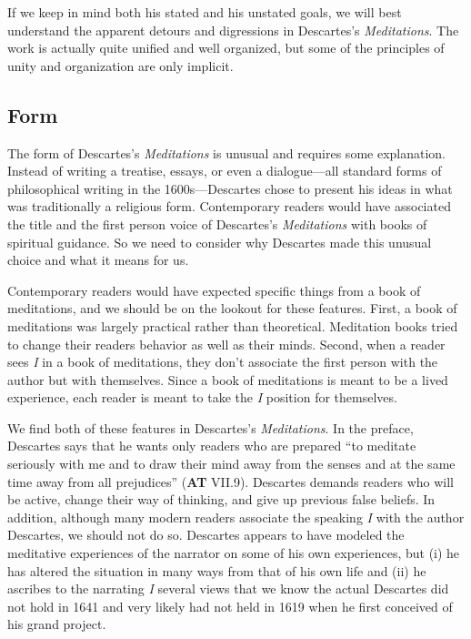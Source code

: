 If we keep in mind both his stated and his unstated goals, we will best understand the apparent detours and digressions in Descartes's \textit{Meditations}. The work is actually quite unified and well organized, but some of the principles of unity and organization are only implicit.

\subsection*{Form}

The form of Descartes's \textit{Meditations} is unusual and requires some explanation. Instead of writing a treatise, essays, or even a dialogue---all standard forms of philosophical writing in the 1600s---Descartes chose to present his ideas in what was traditionally a religious form. Contemporary readers would have associated the title and the first person voice of Descartes's \textit{Meditations} with books of spiritual guidance. So we need to consider why Descartes made this unusual choice and what it means for us.

Contemporary readers would have expected specific things from a book of meditations, and we should be on the lookout for these features. First, a book of meditations was largely practical rather than theoretical. Meditation books tried to change their readers behavior as well as their minds. Second, when a reader sees \textit{I} in a book of meditations, they don't associate the first person with the author but with themselves. Since a book of meditations is meant to be a lived experience, each reader is meant to take the \textit{I} position for themselves.

We find both of these features in Descartes's \textit{Meditations}. In the preface, Descartes says that he wants only readers who are prepared ``to meditate seriously with me and to draw their mind away from the senses and at the same time away from all prejudices'' (\textbf{AT} VII.9). Descartes demands readers who will be active, change their way of thinking, and give up previous false beliefs. In addition, although many modern readers associate the speaking \textit{I} with the author Descartes, we should not do so. Descartes appears to have modeled the meditative experiences of the narrator on some of his own experiences, but (i) he has altered the situation in many ways from that of his own life and (ii) he ascribes to the narrating \textit{I} several views that we know the actual Descartes did not hold in 1641 and very likely had not held in 1619 when he first conceived of his grand project.

